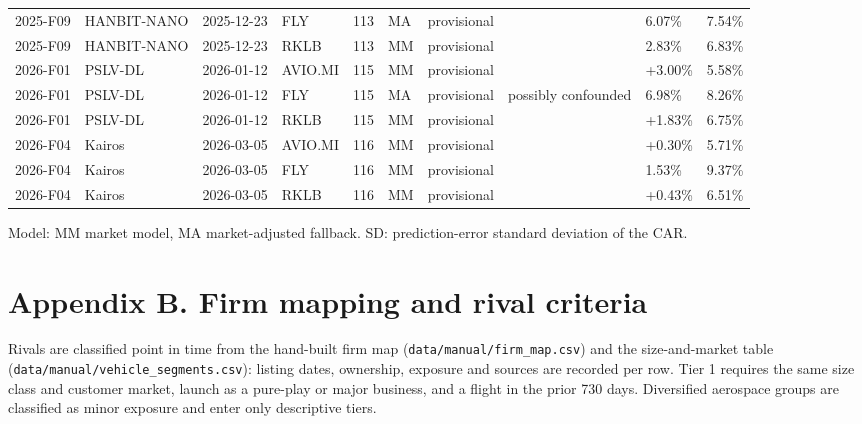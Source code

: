 \documentclass[12pt,a4paper]{article}
\begin{document}
{\begin{xltabular}{\textwidth}{lllllllXll}
2025-F09 & HANBIT-NANO & 2025-12-23 & FLY & 113 & MA & provisional &  & \textminus{}6.07\% & 7.54\% \\
2025-F09 & HANBIT-NANO & 2025-12-23 & RKLB & 113 & MM & provisional &  & \textminus{}2.83\% & 6.83\% \\
2026-F01 & PSLV-DL & 2026-01-12 & AVIO.MI & 115 & MM & provisional &  & +3.00\% & 5.58\% \\
2026-F01 & PSLV-DL & 2026-01-12 & FLY & 115 & MA & provisional & possibly confounded & \textminus{}6.98\% & 8.26\% \\
2026-F01 & PSLV-DL & 2026-01-12 & RKLB & 115 & MM & provisional &  & +1.83\% & 6.75\% \\
2026-F04 & Kairos & 2026-03-05 & AVIO.MI & 116 & MM & provisional &  & +0.30\% & 5.71\% \\
2026-F04 & Kairos & 2026-03-05 & FLY & 116 & MM & provisional &  & \textminus{}1.53\% & 9.37\% \\
2026-F04 & Kairos & 2026-03-05 & RKLB & 116 & MM & provisional &  & +0.43\% & 6.51\% \\
\bottomrule
\end{xltabular}}
\vspace{6pt}

Model: MM market model, MA market-adjusted fallback. SD: prediction-error standard deviation of the CAR.

\section*{Appendix B. Firm mapping and rival criteria}
Rivals are classified point in time from the hand-built firm map (\texttt{data/manual/firm\_map.csv}) and the size-and-market table (\texttt{data/manual/vehicle\_segments.csv}): listing dates, ownership, exposure and sources are recorded per row. Tier 1 requires the same size class and customer market, launch as a pure-play or major business, and a flight in the prior 730 days. Diversified aerospace groups are classified as minor exposure and enter only descriptive tiers.
\end{document}
